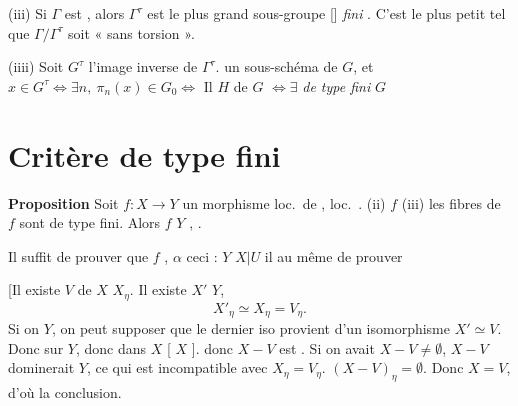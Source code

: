\documentclass[11pt,a4paper]{article}
\begin{document}
(iii) Si $\Gamma$ est , alors $\Gamma^\tau$ est le plus grand sous-groupe [\ill{}] \emph{fini} \ill{} \ill{}. C'est \ill{} le plus petit \ill{} tel que $\Gamma/\Gamma^\tau$ soit « sans torsion ».

(iiii) Soit $G^\tau$ l'image inverse de $\Gamma^\tau$.   un sous-schéma \ill{} de $G$, et
$x \in G^\tau \Longleftrightarrow \exists n,\ \pi_n(x) \in G_0 \Longleftrightarrow$ Il  \ill{} \ill{} $H$ de $G$ \ill{} \ill{}
$\Longleftrightarrow \exists$ \ill{} \ill{} \ill{} \emph{de type fini} \ill{} $G$ \ill{} \ill{} \ill{}

\section{Critère de type fini}


\textbf{Proposition} \quad Soit $f : X \to Y$ un morphisme loc.\ de , \ill{} \ill{} \ill{}  \ill{} \ill{} \ill{} loc.\ .   \ill{} (ii) $f$ \struck{\ill{}} \ill{} (iii) les fibres de $f$   sont de type fini. Alors $f$ \ill{} \ill{} \ill{}  $Y$ , \ill{} \ill{}.


Il suffit de prouver que $f$ \ill{} , \ill{} $\alpha$ \ill{} \ill{} \ill{} \ill{}  \ill{} \ill{} ceci :   \ill{} \ill{} \ill{} $Y$  $X|U$ \ill{}
\ill{} \ill{} il  au même de prouver \ill{} \ill{} \ill{} \ill{} \ill{} \ill{} \ill{}

 [Il existe \ill{} \ill{}   $V$ de $X$ \ill{} \ill{} \ill{} $X_\eta$. Il existe \ill{}
  \struck{\ill{}}
$X'$ \ill{} \ill{} \ill{} \ill{} $Y$, \ill{} \ill{} \ill{} \ill{}
\[
  X'_\eta \simeq X_\eta = V_\eta .
\]
Si on  \ill{} \ill{} \ill{} $Y$, on peut supposer que le dernier iso provient
d'un isomorphisme $X' \simeq V$. Donc  \ill{} \ill{}  sur $Y$, donc  dans $X$ [\ill{} $X$ \ill{}].  
 donc $X - V$ est . 
\struck{\ill{} \ill{}} Si on avait $X - V \neq \emptyset$, $X - V$ dominerait $Y$,
\struck{\ill{}} ce qui est incompatible avec $X_\eta = V_\eta$.
\ill{} $(X - V)_\eta = \emptyset$. Donc $X = V$, d'où la conclusion.
\end{document}
